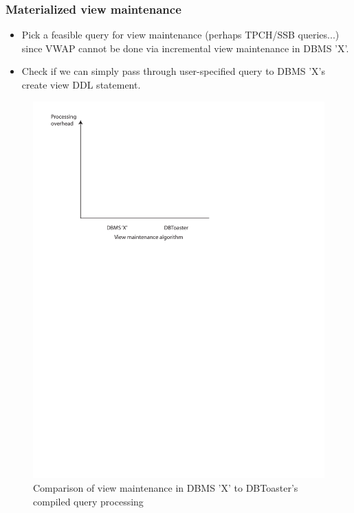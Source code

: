 {\subsubsection{Materialized view maintenance}
\begin{itemize}
\item Pick a feasible query for view maintenance (perhaps TPCH/SSB queries...) since
  VWAP cannot be done via incremental view maintenance in DBMS 'X'.
\item Check if we can simply pass through user-specified query to DBMS 'X's create
  view DDL statement.
\end{itemize}

\begin{figure}
\includegraphics[scale=0.6]{figures/axes-views.pdf}
\caption{Comparison of view maintenance in DBMS 'X' to DBToaster's compiled query processing}
\label{fig:overhead-trigger}
\end{figure}

}
